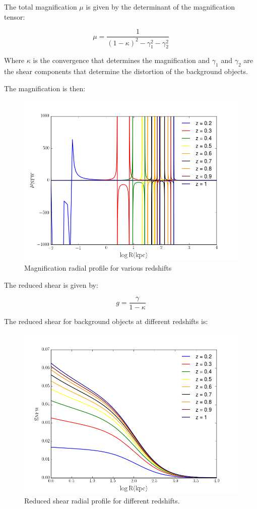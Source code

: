 The total magnification $\mu$ is given by the determinant of the magnification tensor:

\begin{equation}
\mu = \frac{1}{(1-\kappa)^{2}-\gamma^{2}_{1}-\gamma^{2}_{2}}
\end{equation}


Where $\kappa$ is the convergence that determines the magnification and $\gamma_{1}$ and $\gamma_{2}$ are the shear components that determine the distortion of the background objects.

The magnification is then:

\begin{figure}[H]
\centering
\includegraphics[width=12cm]{images/Magnification.png}
\caption[Magnification radial profile]{Magnification radial profile for various redshifts}
\end{figure}

The reduced shear is given by:

\begin{equation}
g=\frac{\gamma}{1-\kappa}
\end{equation}

The reduced shear for background objects at different redshifts is: 

\begin{figure}[H]
\centering
\includegraphics[width=12cm]{images/Reduced_Shear.png}
\caption[Reduced shear radial]{Reduced shear radial profile for different redshifts.}
\end{figure}


